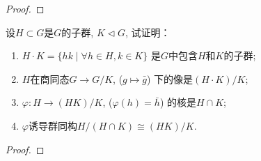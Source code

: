 \begin{proof}
    
\end{proof}

\begin{problem}
    设$H \subset G$是$G$的子群, $K \lhd G$, 试证明：
\begin{enumerate}[(1)]
    \item $H \cdot K = \{hk \mid \forall h \in H, k \in K\}$
是$G$中包含$H$和$K$的子群;
    \item $H$在商同态$G \to G/K$, ($g \mapsto \bar{g}$)
下的像是$(H \cdot K)/K$;
    \item $\varphi:H \to (HK)/K$, ($\varphi(h) = \bar{h}$)
的核是$H \cap K$;
    \item $\varphi$诱导群同构$H/(H \cap K) \cong (HK)/K$.
\end{enumerate}
\end{problem}

\begin{proof}
    
\end{proof}
